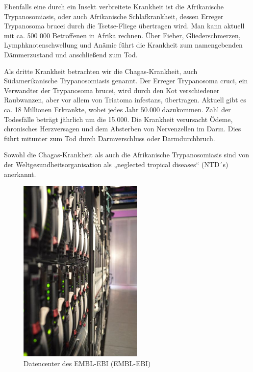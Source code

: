\documentclass[11pt]{article}
\begin{document}
    Ebenfalls eine durch ein Insekt verbreitete Krankheit ist die Afrikanische Trypanosomiasis, oder auch Afrikanische Schlafkrankheit, dessen Erreger Trypanosoma brucei durch die Tsetse-Fliege übertragen wird. Man kann aktuell mit ca. 500 000 Betroffenen in Afrika rechnen. Über Fieber, Gliederschmerzen, Lymphknotenschwellung und Anämie führt die Krankheit zum namengebenden Dämmerzustand und anschließend zum Tod.

    Als dritte Krankheit betrachten wir die Chagas-Krankheit, auch Südamerikanische Trypanosomiasis genannt. Der Erreger Trypanosoma cruci, ein Verwandter der Trypanosoma brucei, wird durch den Kot verschiedener Raubwanzen, aber vor allem von Triatoma infestans, übertragen. Aktuell gibt es ca. 18 Millionen Erkrankte, wobei jedes Jahr 50.000 dazukommen. Zahl der Todesfälle beträgt jährlich um die 15.000. Die Krankheit verursacht Ödeme, chronisches Herzversagen und dem Absterben von Nervenzellen im Darm. Dies führt mitunter zum Tod durch Darmverschluss oder Darmdurchbruch.

    Sowohl die Chagas-Krankheit als auch die Afrikanische Trypanosomiasis sind von der Weltgesundheitsorganisation als „neglected tropical diseases“ (NTD´s) anerkannt.

    \begin{figure}
        \includegraphics[width=\linewidth]{Datacenter}
        \caption{Datencenter des EMBL-EBI (EMBL-EBI)}
    \end{figure}
\end{document}
